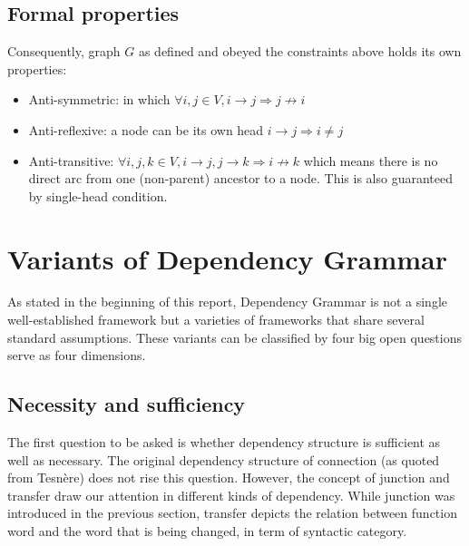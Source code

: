 \documentclass[12pt]{article}
\begin{document}
\subsection{Formal properties}
Consequently, graph $G$ as defined and obeyed the constraints above holds its own properties:
\begin{itemize}
	\item Anti-symmetric: in which $\forall i,j\in V, i\rightarrow j \Rightarrow j\not\rightarrow i$
	\item Anti-reflexive: a node can be its own head $i\rightarrow j \Rightarrow i\neq j$
	\item Anti-transitive: $\forall i,j,k\in V, i\rightarrow j, j\rightarrow k \Rightarrow i\not\rightarrow k$ which means there is no direct arc from one (non-parent) ancestor to a node. This is also guaranteed by single-head condition.
\end{itemize}

\section{Variants of Dependency Grammar} \label{dg_var}

As stated in the beginning of this report, Dependency Grammar is not a single well-established framework but a varieties of frameworks that share several standard assumptions. These variants can be classified by four big open questions serve as four dimensions.

\subsection{Necessity and sufficiency}
The first question to be asked is whether dependency structure is sufficient as well as necessary. The original dependency structure of connection (as quoted from Tesn{\`e}re) does not rise this question. However, the concept of junction and transfer draw our attention in different kinds of dependency. While junction was introduced in the previous section, transfer depicts the relation between function word and the word that is being changed, in term of syntactic category.
\end{document}
